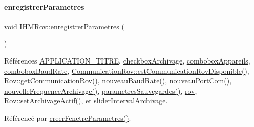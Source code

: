 \paragraph{\texorpdfstring{enregistrer\+Parametres}{enregistrerParametres}}
{\footnotesize\ttfamily void I\+H\+M\+Rov\+::enregistrer\+Parametres (\begin{DoxyParamCaption}{ }\end{DoxyParamCaption})\hspace{0.3cm}{\ttfamily [slot]}}



Références \hyperlink{ihmrov_8h_ab599af93fd63f0c5df05b03aa7448eb9}{A\+P\+P\+L\+I\+C\+A\+T\+I\+O\+N\+\_\+\+T\+I\+T\+RE}, \hyperlink{class_i_h_m_rov_a85be76b5fee7281642db582a79a53511}{checkbox\+Archivage}, \hyperlink{class_i_h_m_rov_a12b970f1d2a170f14a01a684787904a5}{combobox\+Appareils}, \hyperlink{class_i_h_m_rov_a542c0cf87de612cd529b0753b60e4f95}{combobox\+Baud\+Rate}, \hyperlink{class_communication_rov_a513c26b04745fa2ae31b4533d656dfd4}{Communication\+Rov\+::est\+Communication\+Rov\+Disponible()}, \hyperlink{class_rov_ad30543625f584e28bf785a80c59506dc}{Rov\+::get\+Communication\+Rov()}, \hyperlink{class_i_h_m_rov_a051d1d8d545e97c6b838df9054dddc6f}{nouveau\+Baud\+Rate()}, \hyperlink{class_i_h_m_rov_ae64280b18ebe069c1f64bd5f19ef3a2e}{nouveau\+Port\+Com()}, \hyperlink{class_i_h_m_rov_afcfb7f60c126fbaa87cb3f501189cc39}{nouvelle\+Frequence\+Archivage()}, \hyperlink{class_i_h_m_rov_accf04daf204c5810c8a6099bb7e37b7e}{parametres\+Sauvegardes()}, \hyperlink{class_i_h_m_rov_a777ca33fdb295ba6b6773e880356fa1e}{rov}, \hyperlink{class_rov_abbe2eb87a00b651c8259c0c7abca3edd}{Rov\+::set\+Archivage\+Actif()}, et \hyperlink{class_i_h_m_rov_a8c55c93ee14ee51335e72af07b521312}{slider\+Interval\+Archivage}.



Référencé par \hyperlink{class_i_h_m_rov_aed451139ac09ef18b7c92637761d80ce}{creer\+Fenetre\+Parametres()}.


